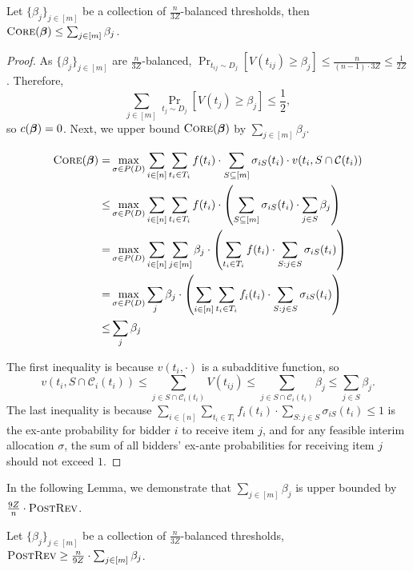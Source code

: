 \begin{lemma}\label{lem:bounding core with beta}
	Let $\{\beta_j\}_{j\in[m]}$ be a collection of $\frac{n}{3Z}$-balanced thresholds, then $\textsc{Core}(\boldsymbol{\beta})\leq \sum_{j\in[m]} \beta_j$.
	\end{lemma}
\begin{proof}


As $\{\beta_j\}_{j\in[m]}$ are $\frac{n}{3Z}$-balanced, $\Pr_{t_{ij}\sim D_j}[V(t_{ij})\geq \beta_j]\leq \frac{n}{(n-1)\cdot 3Z}\leq \frac{1}{2Z}$. Therefore, $$\sum_{j\in[m]} \Pr_{t_{j}\sim D_{j}}\left[V(t_{j})\geq \beta_{j}\right]\leq \frac{1}{2},$$ so $c(\boldsymbol{\beta}) = 0$. Next, we upper bound $\textsc{Core}(\boldsymbol{\beta})$ by $\sum_{j\in[m]} \beta_j$.

	\begin{align*}
		\textsc{Core}(\boldsymbol{\beta}) = &\max_{\sigma \in P(D)} \sum_{i\in[n]}\sum_{t_i\in T_i}f(t_i)\cdot \sum_{S\subseteq[m]}\sigma_{iS}(t_i)\cdot v(t_i,S\cap {\mathcal{C}}(t_i))\\
		\leq &\max_{\sigma \in P(D)} \sum_{i\in[n]}\sum_{t_i\in T_i}f(t_i)\cdot \left(\sum_{S\subseteq[m]}\sigma_{iS}(t_i)\cdot \sum_{j\in S} \beta_j\right)\\
		= &\max_{\sigma \in P(D)} \sum_{i\in[n]} \sum_{j\in[m]} \beta_j\cdot \left(\sum_{t_i\in T_i}f(t_i)\cdot \sum_{S: j\in S}\sigma_{iS}(t_i)\right)\\
		= &\max_{\sigma \in P(D)} \sum_j \beta_j\cdot  \left(\sum_{i\in[n]} \sum_{t_i\in T_i}f_i(t_i)\cdot \sum_{S: j\in S}\sigma_{iS}(t_i)\right)\\
		\leq & \sum_j \beta_j
	\end{align*}
	
	The first inequality is because $v(t_i,\cdot)$ is a subadditive function, so $$v(t_i,S\cap \mathcal{C}_i(t_i))\leq \sum_{j\in S\cap \mathcal{C}_i(t_i)} V(t_{ij})\leq \sum_{j\in S\cap \mathcal{C}_i(t_i)} \beta_j \leq \sum_{j\in S} \beta_j.$$ The last inequality is because $\sum_{i\in[n]}\sum_{t_i\in T_i}f_i(t_i)\cdot \sum_{S: j\in S}\sigma_{iS}(t_i)\leq 1$ is the ex-ante probability for bidder $i$ to receive item $j$, and for any feasible interim allocation $\sigma$, the sum of all bidders' ex-ante probabilities for receiving item $j$ should not exceed $1$.
\end{proof}

In the following Lemma, we demonstrate that $\sum_{j\in [m]} \beta_j$ is upper bounded by $\frac{9Z}{n}\cdot \textsc{PostRev}$.

\begin{lemma}\label{lem:bounding beta with prev}
		Let $\{\beta_j\}_{j\in[m]}$ be a collection of $\frac{n}{3Z}$-balanced thresholds, $\textsc{PostRev}\geq \frac{n}{9Z}\cdot \sum_{j\in [m]} \beta_j$.
\end{lemma}


